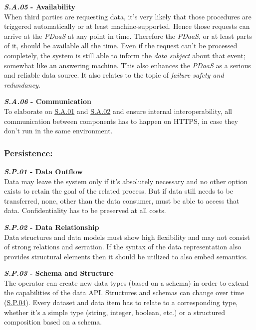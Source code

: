 \documentclass[12pt,english,a4paper,titlepage,cleardoublepage=empty,dottedtoc]{report}
\begin{document}
\textbf{\emph{\protect\hypertarget{sa05}{}{S.A.05}} - Availability}\\
When third parties are requesting data, it's very likely that those
procedures are triggered automatically or at least machine-supported.
Hence those requests can arrive at the \emph{PDaaS} at any point in
time. Therefore the \emph{PDaaS}, or at least parts of it, should be
available all the time. Even if the request can't be processed
completely, the system is still able to inform the \emph{data subject}
about that event; somewhat like an answering machine. This also enhances
the \emph{PDaaS} as a serious and reliable data source. It also relates
to the topic of \emph{failure safety and redundancy}.

\textbf{\emph{\protect\hypertarget{sa06}{}{S.A.06}} - Communication}\\
To elaborate on \protect\hyperlink{sa01}{S.A.01} and
\protect\hyperlink{sa02}{S.A.02} and ensure internal interoperability,
all communication between components has to happen on HTTPS, in case
they don't run in the same environment.

\subsubsection*{Persistence:}\label{persistence}

\textbf{\emph{\protect\hypertarget{sp01}{}{S.P.01}} - Data Outflow}\\
Data may leave the system only if it's absolutely necessary and no other
option exists to retain the goal of the related process. But if data
still needs to be transferred, none, other than the data consumer, must
be able to access that data. Confidentiality has to be preserved at all
costs.

\textbf{\emph{\protect\hypertarget{sp02}{}{S.P.02}} - Data
Relationship}\\
Data structures and data models must show high flexibility and may not
consist of strong relations and serration. If the syntax of the data
representation also provides structural elements then it should be
utilized to also embed semantics.

\textbf{\emph{\protect\hypertarget{sp03}{}{S.P.03}} - Schema and
Structure}\\
The operator can create new data types (based on a schema) in order to
extend the capabilities of the data API. Structures and schemas can
change over time (\protect\hyperlink{sp04}{S.P.04}). Every dataset and
data item has to relate to a corresponding type, whether it's a simple
type (string, integer, boolean, etc.) or a structured composition based
on a schema.
\end{document}
